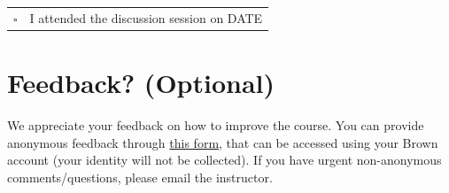 \begin{tabular}[h]{ll}
$\square$ & I attended the discussion session on DATE \\
\end{tabular}

\pagebreak
\section*{Feedback? (Optional)}
We appreciate your feedback on how to improve the course. You can provide anonymous feedback through \href{https://forms.gle/uwBwicWfkYH9v6BU6}{this form}, that can be accessed using your Brown account (your identity will not be collected). If you have urgent non-anonymous comments/questions, please email the instructor.




